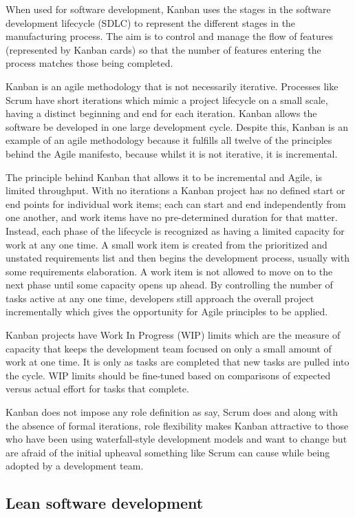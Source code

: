 \begin{spacing}{1.2}
When used for software development, Kanban uses the stages in the software development lifecycle (SDLC) to represent the different stages in the manufacturing process. The aim is to control and manage the flow of features (represented by Kanban cards) so that the number of features entering the process matches those being completed.

Kanban is an agile methodology that is not necessarily iterative. Processes like Scrum have short iterations which mimic a project lifecycle on a small scale, having a distinct beginning and end for each iteration. Kanban allows the software be developed in one large development cycle. Despite this, Kanban is an example of an agile methodology because it fulfills all twelve of the principles behind the Agile manifesto, because whilst it is not iterative, it is incremental.

The principle behind Kanban that allows it to be incremental and Agile, is limited throughput. With no iterations a Kanban project has no defined start or end points for individual work items; each can start and end independently from one another, and work items have no pre-determined duration for that matter. Instead, each phase of the lifecycle is recognized as having a limited capacity for work at any one time. A small work item is created from the prioritized and unstated requirements list and then begins the development process, usually with some requirements elaboration. A work item is not allowed to move on to the next phase until some capacity opens up ahead. By controlling the number of tasks active at any one time, developers still approach the overall project incrementally which gives the opportunity for Agile principles to be applied.

Kanban projects have Work In Progress (WIP) limits which are the measure of capacity that keeps the development team focused on only a small amount of work at one time. It is only as tasks are completed that new tasks are pulled into the cycle. WIP limits should be fine-tuned based on comparisons of expected versus actual effort for tasks that complete.

Kanban does not impose any role definition as say, Scrum does and along with the absence of formal iterations, role flexibility makes Kanban attractive to those who have been using waterfall-style development models and want to change but are afraid of the initial upheaval something like Scrum can cause while being adopted by a development team.

\subsection{Lean software development}


\end{spacing}
